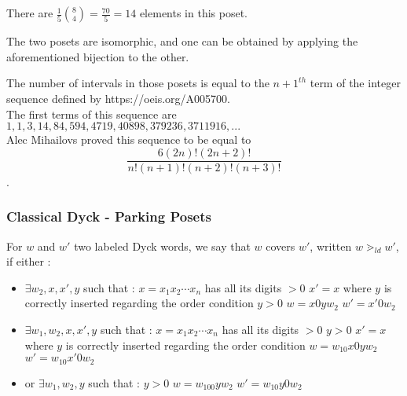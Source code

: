 \begin{example}
\begin{center}
\begin{tikzpicture}[scale = 0.3]
        \end{tikzpicture}
        ~\\
        ~\\
        There are $\frac {1}{5} \binom{8}{4} = \frac{70}{5} = 14$
        elements in this poset.
    \end{center}
\end{example}

\begin{rem}
    The two posets are isomorphic, and one can be obtained by
    applying the aforementioned bijection to the other.
\end{rem}

\begin{theorem}
    The number of intervals in those posets is equal to
    the $n+1^{th}$ term of the integer sequence defined by
    https://oeis.org/A005700.\\
    The first terms of this sequence are $1, 1, 3, 14, 84,
    594, 4719, 40898, 379236, 3711916, ...$\\
    Alec Mihailovs proved this sequence to be equal to
    $$\frac {6 (2n)! (2n+2)!}{n!(n+1)!(n+2)!(n+3)!}$$.
\end{theorem}

\subsubsection{Classical Dyck - Parking Posets}

\begin{definition}[$\gtrdot_{ld}$]
    For $w$ and $w'$ two labeled Dyck words, we say
    that $w$ covers $w'$, written $w \gtrdot_{ld} w'$,
    if either :
    \begin{itemize}
        \item $\exists w_2, x, x', y$ such that :
            \subitem $x = x_1x_2 \cdots x_n$ has all 
            its digits $> 0$
            \subitem $x' = x$ where $y$ is correctly
            inserted regarding the order condition
            \subitem $y > 0$
            \subitem $w = x0yw_2$
            \subitem $w' = x'0w_2$
        \item $\exists w_1, w_2, x, x', y$ such that :
            \subitem $x = x_1x_2 \cdots x_n$ has all 
                its digits $> 0$
            \subitem $y > 0$
            \subitem $x' = x$ where $y$ is correctly
                inserted regarding the order condition
            \subitem $w = w_10x0yw_2$
            \subitem $w' = w_10x'0w_2$
        \item or $\exists w_1, w_2, y$ such that :
            \subitem $y > 0$
            \subitem $w = w_100yw_2$
            \subitem $w' = w_10y0w_2$
    \end{itemize}  
\end{definition}

